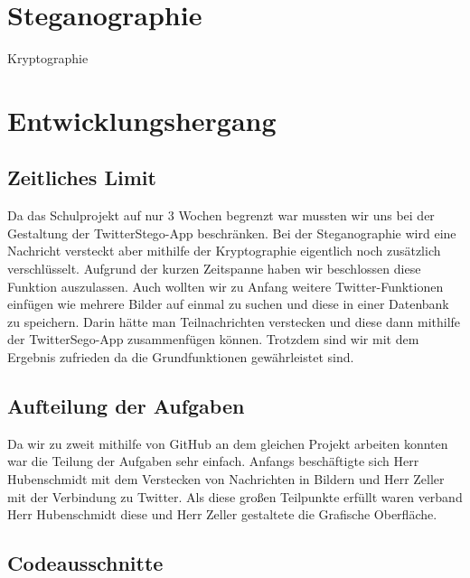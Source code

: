\documentclass[11pt]{article}
\begin{document}
\newpage
\section{Steganographie}

Kryptographie



\newpage
\section{Entwicklungshergang}

\subsection{Zeitliches Limit}

Da das Schulprojekt auf nur 3 Wochen begrenzt war mussten wir uns bei der Gestaltung der TwitterStego-App beschränken. Bei der Steganographie wird eine Nachricht versteckt aber mithilfe der Kryptographie eigentlich noch zusätzlich verschlüsselt. Aufgrund der kurzen Zeitspanne haben wir beschlossen diese Funktion auszulassen. Auch wollten wir zu Anfang weitere Twitter-Funktionen einfügen wie mehrere Bilder auf einmal zu suchen und diese in einer Datenbank zu speichern. Darin hätte man Teilnachrichten verstecken und diese dann mithilfe der TwitterSego-App zusammenfügen können. Trotzdem sind wir mit dem Ergebnis zufrieden da die Grundfunktionen gewährleistet sind.

\subsection{Aufteilung der Aufgaben}

Da wir zu zweit mithilfe von GitHub an dem gleichen Projekt arbeiten konnten war die Teilung der Aufgaben sehr einfach. Anfangs beschäftigte sich Herr Hubenschmidt mit dem Verstecken von Nachrichten in Bildern und Herr Zeller mit der Verbindung zu Twitter. Als diese großen Teilpunkte erfüllt waren verband Herr Hubenschmidt diese und Herr Zeller gestaltete die Grafische Oberfläche.

\newpage
\subsection{Codeausschnitte}
\end{document}
